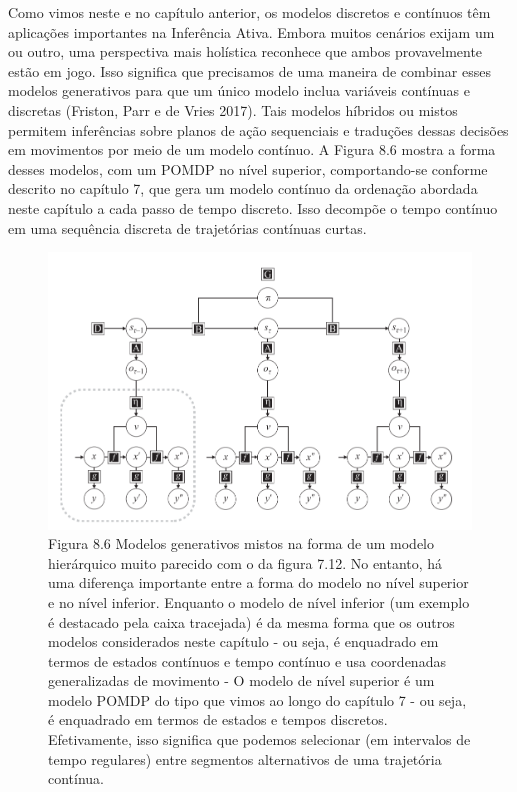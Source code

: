 \documentclass[
  12pt,
]{book}
\begin{document}
Como vimos neste e no capítulo anterior, os modelos discretos e contínuos têm aplicações importantes na Inferência Ativa. Embora muitos cenários exijam um ou outro, uma perspectiva mais holística reconhece que ambos provavelmente estão em jogo. Isso significa que precisamos de uma maneira de combinar esses modelos generativos para que um único modelo inclua variáveis contínuas e discretas (Friston, Parr e de Vries 2017). Tais modelos híbridos ou mistos permitem inferências sobre planos de ação sequenciais e traduções dessas decisões em movimentos por meio de um modelo contínuo. A Figura 8.6 mostra a forma desses modelos, com um POMDP no nível superior, comportando-se conforme descrito no capítulo 7, que gera um modelo contínuo da ordenação abordada neste capítulo a cada passo de tempo discreto. Isso decompõe o tempo contínuo em uma sequência discreta de trajetórias contínuas curtas.

\begin{figure}
\centering
\includegraphics{images/Figura_8_6.png}
\caption{Figura 8.6 Modelos generativos mistos na forma de um modelo hierárquico muito parecido com o da figura 7.12. No entanto, há uma diferença importante entre a forma do modelo no nível superior e no nível inferior. Enquanto o modelo de nível inferior (um exemplo é destacado pela caixa tracejada) é da mesma forma que os outros modelos considerados neste capítulo - ou seja, é enquadrado em termos de estados contínuos e tempo contínuo e usa coordenadas generalizadas de movimento - O modelo de nível superior é um modelo POMDP do tipo que vimos ao longo do capítulo 7 - ou seja, é enquadrado em termos de estados e tempos discretos. Efetivamente, isso significa que podemos selecionar (em intervalos de tempo regulares) entre segmentos alternativos de uma trajetória contínua.}
\end{figure}
\end{document}
